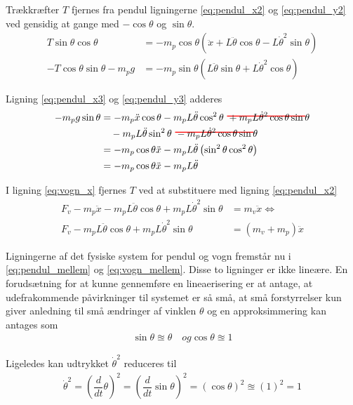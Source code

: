 Trækkræfter $T$ fjernes fra pendul ligningerne \ref{eq:pendul_x2} og \ref{eq:pendul_y2} ved gensidig at gange med $-\cos{\theta}$ og $\sin{\theta}$. 
\begin{align}
T\sin{\theta}\cos{\theta} &=   -m_p \cos{\theta} \left( \ddot{x} + L\ddot{\theta}\cos{\theta} - L\dot{\theta}^2\sin{\theta} \right) \label{eq:pendul_x3} \\
-T\cos{\theta}\sin{\theta} - m_p g &=  -m_p \sin{\theta} \left( L\ddot{\theta}\sin{\theta} + L\dot{\theta}^2\cos{\theta}\right) \label{eq:pendul_y3}
\end{align}

Ligning \ref{eq:pendul_x3} og \ref{eq:pendul_y3} adderes
\begin{align}
-m_p g \sin{\theta}    &= - m_p \ddot{x}\cos{\theta}
						- m_p L\ddot{\theta}\cos^2\theta\
						\hcancel[red]{+ m_p L \dot{\theta}^2\cos{\theta}\sin{\theta}}\\
					   &\quad - m_p L\ddot{\theta}\sin^2\theta\
					    \hcancel[red]{- m_p L \dot{\theta}^2\cos{\theta}\sin{\theta}} \\
					   &=- m_p \cos{\theta}\ddot{x} - m_p L \ddot{\theta} \left(\sin^2 \theta \cos^2 \theta \right) \\
					   &=- m_p \cos{\theta}\ddot{x} - m_p L \ddot{\theta} \label{eq:pendul_mellem}
\end{align}

I ligning \ref{eq:vogn_x} fjernes $T$ ved at substituere med ligning \ref{eq:pendul_x2}
\begin{align}
F_v - m_p \ddot{x} - m_p L\ddot{\theta}\cos{\theta} + m_p L\dot{\theta}^2\sin{\theta} &= m_v \ddot{x} \Leftrightarrow \\
F_v - m_p L\ddot{\theta}\cos{\theta} + m_p L\dot{\theta}^2\sin{\theta} &= (m_v + m_p)  \ddot{x} \label{eq:vogn_mellem}
\end{align}

Ligningerne af det fysiske system for pendul og vogn fremstår nu i \ref{eq:pendul_mellem} og \ref{eq:vogn_mellem}. Disse to ligninger er ikke lineære. En forudsætning for at kunne gennemføre en lineaerisering er at antage, at udefrakommende påvirkninger til systemet er så små, at små forstyrrelser kun giver anledning til små ændringer af vinklen $\theta$ og en approksimmering kan antages som
\begin{align}
\sin{\theta} \approxeq \theta \quad og \cos{\theta} \approxeq 1
\end{align} 

Ligeledes kan udtrykket $\dot{\theta}^2$ reduceres til
\begin{align}
\dot{\theta}^2 = \left( \dfrac{d}{dt}\theta \right)^2 =  \left( \dfrac{d}{dt}\sin{\theta} \right)^2 = \left(\cos{\theta}\right)^2 \approxeq (1)^2 = 1
\end{align}

